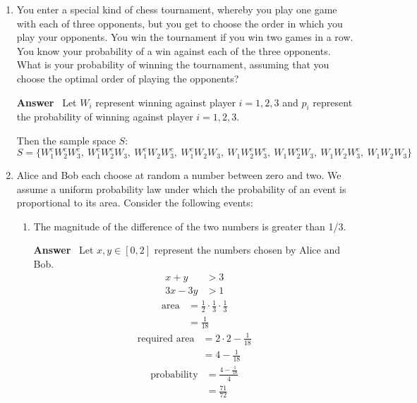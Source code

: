 \documentclass[paper=usletter, fontsize=12pt]{article}
\newcommand{\ans}{\textbf{Answer} \ }
\begin{document}
\begin{enumerate}
        \item You enter a special kind of chess tournament, whereby you play
        one game with each of three opponents, but you get to choose the order
        in which you play your opponents. You win the tournament if you win two
        games in a row. You know your probability of a win against each of the
        three opponents. What is your probability of winning the tournament,
        assuming that you choose the optimal order of playing the opponents?

        \ans Let $W_i$ represent winning against player $i = 1, 2, 3$ and $p_i$
        represent the probability of winning against player $i = 1, 2, 3$.

        Then the sample space $S$:
            \[ S = \{ W_{1}^{c}W_{2}^{c}W_{3}^{c}, \ W_{1}^{c}W_{2}^{c}W_{3}, \
            W_{1}^{c}W_{2}W_{3}^{c}, \ W_{1}^{c}W_{2}W_{3}, \
            W_{1}W_{2}^{c}W_{3}^{c}, \ W_{1}W_{2}^{c}W_{3}, \
            W_{1}W_{2}W_{3}^{c}, \ W_{1}W_{2}W_{3} \} \]

        \item Alice and Bob each choose at random a number between zero and
        two. We assume a uniform probability law under which the probability of
        an event is proportional to its area. Consider the following events:

            \begin{enumerate}

                \item The magnitude of the difference of the two numbers is
                greater than 1/3.

                \ans Let $x, y \in [0, 2]$ represent the numbers chosen by
                Alice and Bob.
                \begin{align*}
                    x + y & > 3 \\
                    3x - 3y & > 1
                \end{align*}
                \begin{align*}
                    \text{area} & = \frac{1}{2} \cdot \frac{1}{3} \cdot
                    \frac{1}{3} \\
                    & = \frac{1}{18}
                \end{align*}
                \begin{align*}
                    \text{required area} & = 2 \cdot 2 - \frac{1}{18} \\
                    & = 4 - \frac{1}{18}
                \end{align*}
                \begin{align*}
                    \text{probability} & = \frac{4 - \frac{1}{18}}{4} \\
                    & = \frac{71}{72}
                \end{align*}


\end{enumerate}
\end{enumerate}
\end{document}
